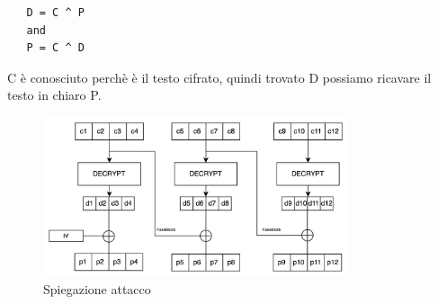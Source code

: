 \begin{verbatim}
   D = C ^ P 
   and 
   P = C ^ D
\end{verbatim}
C è conosciuto perchè è il testo cifrato, quindi trovato D possiamo ricavare il testo in chiaro P.

\begin{figure}[h!]
    \includegraphics[width=0.8\textwidth]{img/attack.jpeg}
    \centering
    \caption{Spiegazione attacco}
    \label{fig:attack_1}
\end{figure}

